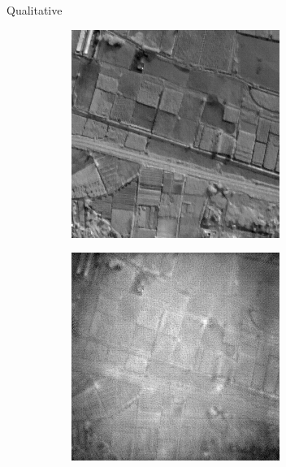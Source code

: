 \begin{frame}{Qualitative}
    \begin{figure}
        \centering
        \begin{subfigure}[b]{0.185\textwidth}
            \centering
            \includegraphics[width=\textwidth]{../figs/outputs/pan/71.png}
        \end{subfigure}
        \hspace{0.05em}%
        \begin{subfigure}[b]{0.185\textwidth}
            \centering
            \includegraphics[width=\textwidth]{../figs/outputs/cut/71.png}

\end{subfigure}
\end{figure}
\end{frame}
